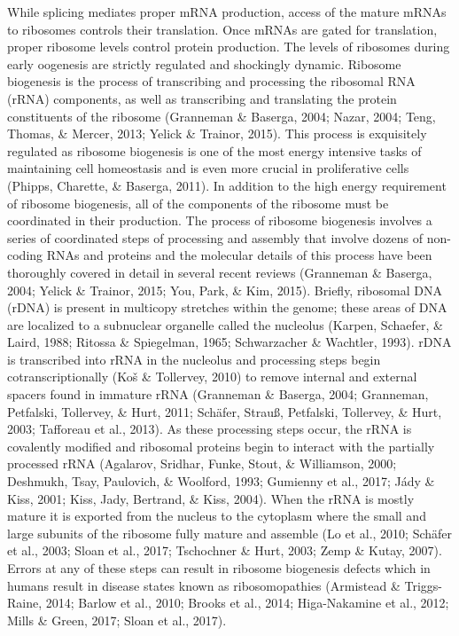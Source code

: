 \documentclass[12pt,twoside]{reedthesis}
\begin{document}
While splicing mediates proper mRNA production, access of the mature
mRNAs to ribosomes controls their translation. Once mRNAs are gated for
translation, proper ribosome levels control protein production. The
levels of ribosomes during early oogenesis are strictly regulated and
shockingly dynamic. Ribosome biogenesis is the process of transcribing
and processing the ribosomal RNA (rRNA) components, as well as
transcribing and translating the protein constituents of the ribosome
(Granneman \& Baserga, 2004; Nazar, 2004; Teng, Thomas, \& Mercer, 2013; Yelick \& Trainor, 2015). This
process is exquisitely regulated as ribosome biogenesis is one of the
most energy intensive tasks of maintaining cell homeostasis and is even
more crucial in proliferative cells (Phipps, Charette, \& Baserga, 2011). In addition to
the high energy requirement of ribosome biogenesis, all of the
components of the ribosome must be coordinated in their production. The
process of ribosome biogenesis involves a series of coordinated steps of
processing and assembly that involve dozens of non-coding RNAs and
proteins and the molecular details of this process have been thoroughly
covered in detail in several recent reviews (Granneman \& Baserga, 2004; Yelick \& Trainor, 2015; You, Park, \& Kim, 2015). Briefly, ribosomal DNA (rDNA) is present in
multicopy stretches within the genome; these areas of DNA are localized
to a subnuclear organelle called the nucleolus (Karpen, Schaefer, \& Laird, 1988; Ritossa \& Spiegelman, 1965; Schwarzacher \& Wachtler, 1993). rDNA is transcribed into rRNA in
the nucleolus and processing steps begin cotranscriptionally
(Koš \& Tollervey, 2010) to remove internal and external spacers found in immature
rRNA (Granneman \& Baserga, 2004; Granneman, Petfalski, Tollervey, \& Hurt, 2011; Schäfer, Strauß, Petfalski, Tollervey, \& Hurt, 2003; Tafforeau et al., 2013). As these processing steps occur, the rRNA is
covalently modified and ribosomal proteins begin to interact with the
partially processed rRNA (Agalarov, Sridhar, Funke, Stout, \& Williamson, 2000; Deshmukh, Tsay, Paulovich, \& Woolford, 1993; Gumienny et al., 2017; Jády \& Kiss, 2001; Kiss, Jady, Bertrand, \& Kiss, 2004). When the rRNA is mostly
mature it is exported from the nucleus to the cytoplasm where the small
and large subunits of the ribosome fully mature and assemble
(Lo et al., 2010; Schäfer et al., 2003; Sloan et al., 2017; Tschochner \& Hurt, 2003; Zemp \& Kutay, 2007). Errors at any of these steps can result in ribosome
biogenesis defects which in humans result in disease states known as
ribosomopathies (Armistead \& Triggs-Raine, 2014; Barlow et al., 2010; Brooks et al., 2014; Higa-Nakamine et al., 2012; Mills \& Green, 2017; Sloan et al., 2017).
\end{document}
